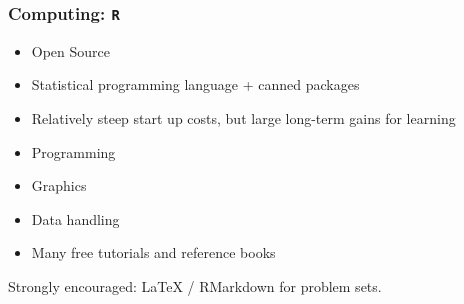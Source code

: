 \documentclass[xcolor=svgnames,9pt,english,aspectratio=169,t]{beamer}
\begin{document}
\begin{frame}
\frametitle{Computing: \texttt{R}}
\begin{itemize}
\item Open Source
\item Statistical programming
language + canned packages
\item Relatively steep start up costs, but
large long-term gains for
learning
\item Programming
\item Graphics
\item Data handling
\item Many free tutorials and reference books
\end{itemize}\bigskip
Strongly encouraged: LaTeX / RMarkdown for problem sets.\\\medskip
\end{frame}
\end{document}
